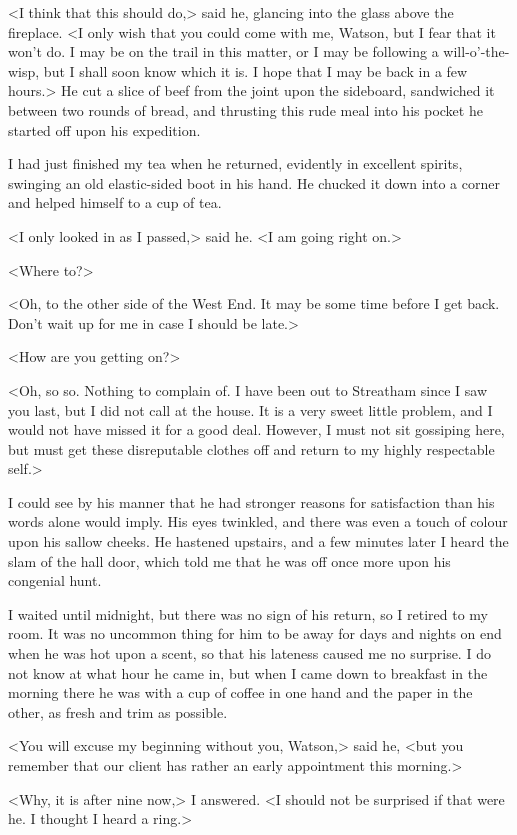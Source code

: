 <I think that this should do,> said he, glancing into the glass above the fireplace. <I only wish that you could come with me, Watson, but I fear that it won't do. I may be on the trail in this matter, or I may be following a will-o'-the-wisp, but I shall soon know which it is. I hope that I may be back in a few hours.> He cut a slice of beef from the joint upon the sideboard, sandwiched it between two rounds of bread, and thrusting this rude meal into his pocket he started off upon his expedition.

I had just finished my tea when he returned, evidently in excellent spirits, swinging an old elastic-sided boot in his hand. He chucked it down into a corner and helped himself to a cup of tea.

<I only looked in as I passed,> said he. <I am going right on.>

<Where to?>

<Oh, to the other side of the West End. It may be some time before I get back. Don't wait up for me in case I should be late.>

<How are you getting on?>

<Oh, so so. Nothing to complain of. I have been out to Streatham since I saw you last, but I did not call at the house. It is a very sweet little problem, and I would not have missed it for a good deal. However, I must not sit gossiping here, but must get these disreputable clothes off and return to my highly respectable self.>

I could see by his manner that he had stronger reasons for satisfaction than his words alone would imply. His eyes twinkled, and there was even a touch of colour upon his sallow cheeks. He hastened upstairs, and a few minutes later I heard the slam of the hall door, which told me that he was off once more upon his congenial hunt.

I waited until midnight, but there was no sign of his return, so I retired to my room. It was no uncommon thing for him to be away for days and nights on end when he was hot upon a scent, so that his lateness caused me no surprise. I do not know at what hour he came in, but when I came down to breakfast in the morning there he was with a cup of coffee in one hand and the paper in the other, as fresh and trim as possible.

<You will excuse my beginning without you, Watson,> said he, <but you remember that our client has rather an early appointment this morning.>

<Why, it is after nine now,> I answered. <I should not be surprised if that were he. I thought I heard a ring.>

